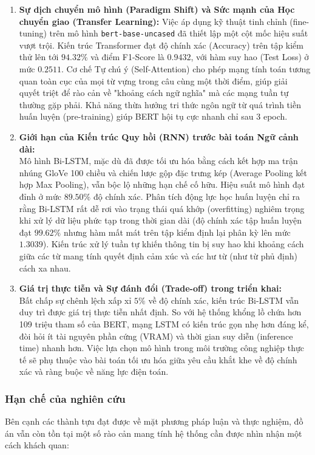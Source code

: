 \documentclass[a4paper]{article}
\theoremstyle{definition}
\begin{document}
\begin{enumerate}
	\item \textbf{Sự dịch chuyển mô hình (Paradigm Shift) và Sức mạnh của Học chuyển giao (Transfer Learning):} Việc áp dụng kỹ thuật tinh chỉnh (fine-tuning) trên mô hình \texttt{bert-base-uncased} đã thiết lập một cột mốc hiệu suất vượt trội. Kiến trúc Transformer đạt độ chính xác (Accuracy) trên tập kiểm thử lên tới $94.32\%$ và điểm F1-Score là $0.9432$, với hàm suy hao (Test Loss) ở mức $0.2511$. Cơ chế Tự chú ý (Self-Attention) cho phép mạng tính toán tương quan toàn cục của mọi từ vựng trong câu cùng một thời điểm, giúp giải quyết triệt để rào cản về "khoảng cách ngữ nghĩa" mà các mạng tuần tự thường gặp phải. Khả năng thừa hưởng tri thức ngôn ngữ từ quá trình tiền huấn luyện (pre-training) giúp BERT hội tụ cực nhanh chỉ sau 3 epoch.

	\item \textbf{Giới hạn của Kiến trúc Quy hồi (RNN) trước bài toán Ngữ cảnh dài:}\\
	      Mô hình Bi-LSTM, mặc dù đã được tối ưu hóa bằng cách kết hợp ma trận nhúng GloVe 100 chiều và chiến lược gộp đặc trưng kép (Average Pooling kết hợp Max Pooling), vẫn bộc lộ những hạn chế cố hữu. Hiệu suất mô hình đạt đỉnh ở mức $89.50\%$ độ chính xác. Phân tích động lực học huấn luyện chỉ ra rằng Bi-LSTM rất dễ rơi vào trạng thái quá khớp (overfitting) nghiêm trọng khi xử lý dữ liệu phức tạp trong thời gian dài (độ chính xác tập huấn luyện đạt $99.62\%$ nhưng hàm mất mát trên tập kiểm định lại phân kỳ lên mức $1.3039$). Kiến trúc xử lý tuần tự khiến thông tin bị suy hao khi khoảng cách giữa các từ mang tính quyết định cảm xúc và các hư từ (như từ phủ định) cách xa nhau.

	\item \textbf{Giá trị thực tiễn và Sự đánh đổi (Trade-off) trong triển khai:}\\
	      Bất chấp sự chênh lệch xấp xỉ $5\%$ về độ chính xác, kiến trúc Bi-LSTM vẫn duy trì được giá trị thực tiễn nhất định. So với hệ thống khổng lồ chứa hơn 109 triệu tham số của BERT, mạng LSTM có kiến trúc gọn nhẹ hơn đáng kể, đòi hỏi ít tài nguyên phần cứng (VRAM) và thời gian suy diễn (inference time) nhanh hơn. Việc lựa chọn mô hình trong môi trường công nghiệp thực tế sẽ phụ thuộc vào bài toán tối ưu hóa giữa yêu cầu khắt khe về độ chính xác và ràng buộc về năng lực điện toán.
\end{enumerate}

\subsubsection{Hạn chế của nghiên cứu}
Bên cạnh các thành tựu đạt được về mặt phương pháp luận và thực nghiệm, đồ án vẫn còn tồn tại một số rào cản mang tính hệ thống cần được nhìn nhận một cách khách quan:
\end{document}
